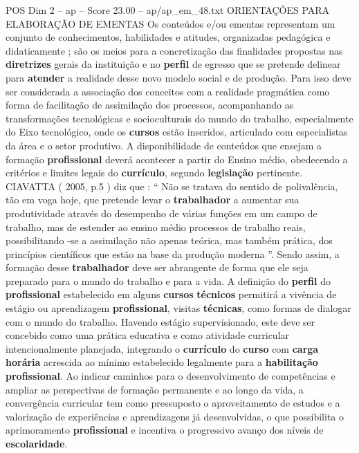 \begin{textsample}{POS Dim 2 – ap – Score 23.00 – ap/ap\_em\_48.txt}  \label{ex:f2_pos_145}
ORIENTAÇÕES PARA ELABORAÇÃO DE EMENTAS Os conteúdos e/ou ementas representam um conjunto de conhecimentos, habilidades e atitudes, organizadas pedagógica e didaticamente ; são os meios para a concretização das finalidades propostas nas \textbf{diretrizes} gerais da instituição e no \textbf{perfil} de egresso que se pretende delinear para \textbf{atender} a realidade desse novo modelo social e de produção.
Para isso deve ser considerada a associação dos conceitos com a realidade pragmática como forma de facilitação de assimilação dos processos, acompanhando as transformações tecnológicas e socioculturais do mundo do trabalho, especialmente do Eixo tecnológico, onde os \textbf{cursos} estão inseridos, articulado com especialistas da área e o setor produtivo.
A disponibilidade de conteúdos que ensejam a formação \textbf{profissional} deverá acontecer a partir do Ensino médio, obedecendo a critérios e limites legais do \textbf{currículo}, segundo \textbf{legislação} pertinente.
CIAVATTA ( 2005, p.5 ) diz que : “ Não se tratava do sentido de polivalência, tão em voga hoje, que pretende levar o \textbf{trabalhador} a aumentar sua produtividade através do desempenho de várias funções em um campo de trabalho, mas de estender ao ensino médio processos de trabalho reais, possibilitando -se a assimilação não apenas teórica, mas também prática, dos princípios científicos que estão na base da produção moderna ”.
Sendo assim, a formação desse \textbf{trabalhador} deve ser abrangente de forma que ele seja preparado para o mundo do trabalho e para a vida.
A definição do \textbf{perfil} do \textbf{profissional} estabelecido em alguns \textbf{cursos} \textbf{técnicos} permitirá a vivência de estágio ou aprendizagem \textbf{profissional}, visitas \textbf{técnicas}, como formas de dialogar com o mundo do trabalho.
Havendo estágio supervisionado, este deve ser concebido como uma prática educativa e como atividade curricular intencionalmente planejada, integrando o \textbf{currículo} do \textbf{curso} com \textbf{carga} \textbf{horária} acrescida ao mínimo estabelecido legalmente para a \textbf{habilitação} \textbf{profissional}.
Ao indicar caminhos para o desenvolvimento de competências e ampliar as perspectivas de formação permanente e ao longo da vida, a convergência curricular tem como pressuposto o aproveitamento de estudos e a valorização de experiências e aprendizagens já desenvolvidas, o que possibilita o aprimoramento \textbf{profissional} e incentiva o progressivo avanço dos níveis de \textbf{escolaridade}.

\end{textsample}
